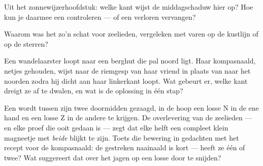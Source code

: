 \begin{exercise}[$\star$]\label{exo:g4:magnets-and-compass:8}
Uit het zonnewijzerhoofdstuk: welke kant wijst de middagschaduw
hier op? Hoe kun je daarmee een  controleren --- of een verloren
 vervangen?
\end{exercise}

\begin{exercise}[$\star$]\label{exo:g4:magnets-and-compass:9}
Waarom was het  zo'n schat voor zeelieden, vergeleken met varen
op de kustlijn of op de sterren?
\end{exercise}

\begin{exercise}[$\star\star$]\label{exo:g4:magnets-and-compass:10}
Een wandelaarster loopt naar een berghut die pal noord ligt. Haar
kompasnaald, netjes gehouden, wijst naar de riemgesp van haar vriend
in plaats van naar het noorden zodra hij dicht aan haar linkerkant
loopt. Wat gebeurt er, welke kant dreigt ze af te dwalen, en wat is de
oplossing in één stap?
\end{exercise}

\begin{exercise}[$\star\star$]\label{exo:g4:magnets-and-compass:11}
Een  wordt tussen zijn twee  doormidden gezaagd, in de hoop
een losse N in de ene hand en een losse Z in de andere te krijgen. De
overlevering van de zeelieden --- en elke proef die ooit gedaan is ---
zegt dat elke helft een compleet klein magneetje met \emph{beide}
 blijkt te zijn. Toets die bewering in gedachten met het recept
voor de kompasnaald: de gestreken naainaald is kort --- heeft ze één
 of twee? Wat suggereert dat over het jagen op een losse
 door te snijden?
\end{exercise}
